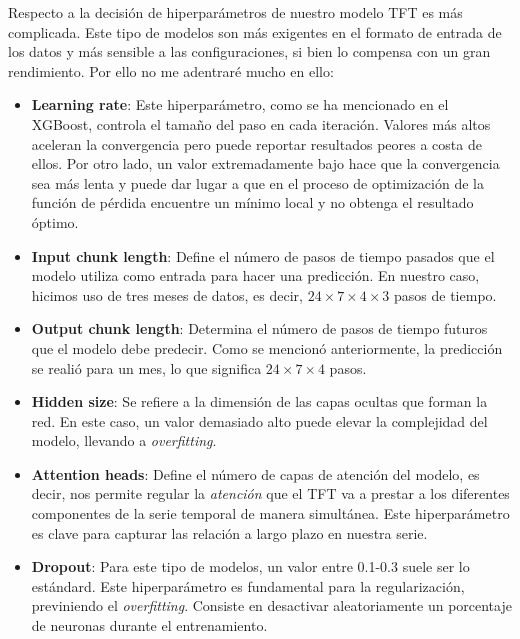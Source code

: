 %
%
%
Respecto a la decisión de hiperparámetros de nuestro modelo TFT es más complicada. Este tipo de modelos son más exigentes en el formato de entrada de los datos y más sensible a las configuraciones, si bien lo compensa con un gran rendimiento. Por ello no me adentraré mucho en ello:
\begin{itemize}
    \item \textbf{Learning rate}: Este hiperparámetro, como se ha mencionado en el XGBoost, controla el tamaño del paso en cada iteración. Valores más altos aceleran la convergencia pero puede reportar resultados peores a costa de ellos. Por otro lado, un valor extremadamente bajo hace que la convergencia sea más lenta y puede dar lugar a que en el proceso de optimización de la función de pérdida encuentre un mínimo local y no obtenga el resultado óptimo.
    
    \item \textbf{Input chunk length}: Define el número de pasos de tiempo pasados que el modelo utiliza como entrada para hacer una predicción. En nuestro caso, hicimos uso de tres meses de datos, es decir, $24 \times 7 \times 4 \times 3$ pasos de tiempo.
    \item \textbf{Output chunk length}: Determina el número de pasos de tiempo futuros que el modelo debe predecir. Como se mencionó anteriormente, la predicción se realió para un mes, lo que significa $24 \times 7 \times 4$ pasos.
     
    \item \textbf{Hidden size}: Se refiere a la dimensión de las capas ocultas que forman la red. En este caso, un valor demasiado alto puede elevar la complejidad del modelo, llevando a \textit{overfitting}.
     
    \item \textbf{Attention heads}: Define el número de capas de atención del modelo, es decir, nos permite regular la \textit{atención} que el TFT va a prestar a los diferentes componentes de la serie temporal de manera simultánea. Este hiperparámetro es clave para capturar las relación a largo plazo en nuestra serie.
     
    \item \textbf{Dropout}: Para este tipo de modelos, un valor entre 0.1-0.3 suele ser lo estándard. Este hiperparámetro es fundamental para la regularización, previniendo el \textit{overfitting}. Consiste en desactivar aleatoriamente un porcentaje de neuronas durante el entrenamiento.
\end{itemize}

